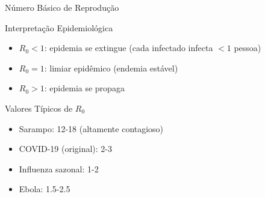 \begin{frame}{Número Básico de Reprodução}


\begin{block}{Interpretação Epidemiológica}
\begin{itemize}
    \item $R_0 < 1$: epidemia se extingue (cada infectado infecta $< 1$ pessoa)
    \item $R_0 = 1$: limiar epidêmico (endemia estável)
    \item $R_0 > 1$: epidemia se propaga
\end{itemize}
\end{block}

\begin{exampleblock}{Valores Típicos de $R_0$}
\begin{itemize}
    \item Sarampo: 12-18 (altamente contagioso)
    \item COVID-19 (original): 2-3
    \item Influenza sazonal: 1-2
    \item Ebola: 1.5-2.5
\end{itemize}
\end{exampleblock}
\end{frame}

